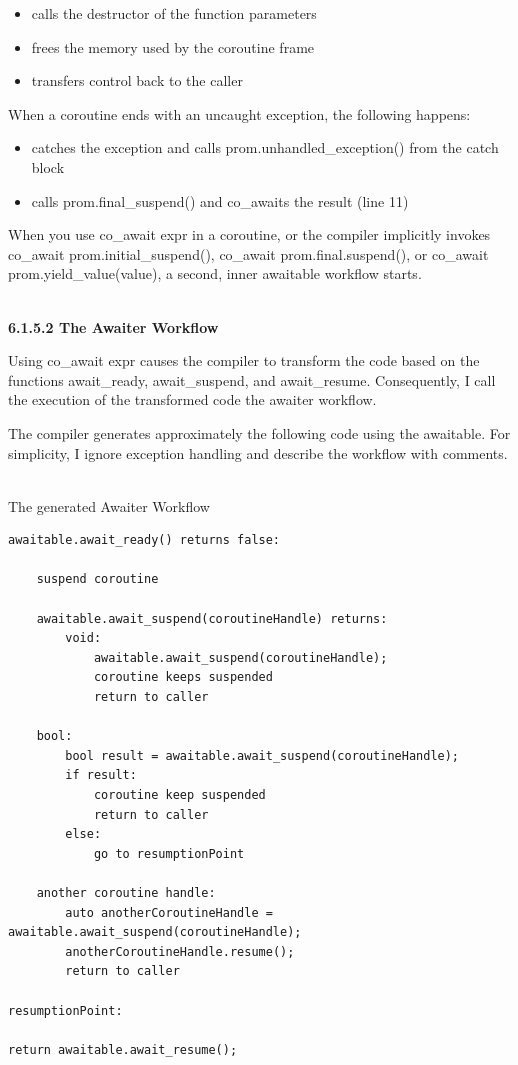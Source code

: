 \begin{itemize}
\begin{itemize}
\item 
calls the destructor of the function parameters

\item 
frees the memory used by the coroutine frame

\item 
transfers control back to the caller
\end{itemize}
\end{itemize}

When a coroutine ends with an uncaught exception, the following happens:

\begin{itemize}
\item 
catches the exception and calls prom.unhandled\_exception() from the catch block

\item 
calls prom.final\_suspend() and co\_awaits the result (line 11)
\end{itemize}

When you use co\_await expr in a coroutine, or the compiler implicitly invokes co\_await prom.initial\_suspend(), co\_await prom.final.suspend(), or co\_await prom.yield\_value(value), a second, inner awaitable workflow starts.

\hspace*{\fill} \\ %
\noindent
\textbf{6.1.5.2\hspace{0.2cm} The Awaiter Workflow}

Using co\_await expr causes the compiler to transform the code based on the functions await\_ready, await\_suspend, and await\_resume. Consequently, I call the execution of the transformed code the awaiter workflow.

The compiler generates approximately the following code using the awaitable. For simplicity, I ignore exception handling and describe the workflow with comments.

\hspace*{\fill} \\ %
\noindent
The generated Awaiter Workflow
\begin{lstlisting}[style=styleCXX]
awaitable.await_ready() returns false:

	suspend coroutine
	
	awaitable.await_suspend(coroutineHandle) returns:
		void:
			awaitable.await_suspend(coroutineHandle);
			coroutine keeps suspended
			return to caller
	
	bool:
		bool result = awaitable.await_suspend(coroutineHandle);
		if result:
			coroutine keep suspended
			return to caller
		else:
			go to resumptionPoint
	
	another coroutine handle:
		auto anotherCoroutineHandle = awaitable.await_suspend(coroutineHandle);
		anotherCoroutineHandle.resume();
		return to caller

resumptionPoint:

return awaitable.await_resume();
\end{lstlisting}

